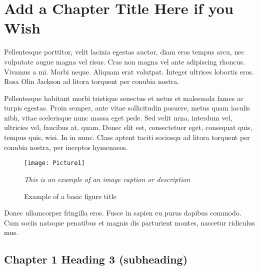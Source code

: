 \chapter{Add a Chapter Title Here if you Wish}



Pellentesque porttitor, velit lacinia egestas auctor, diam eros tempus arcu, nec vulputate augue magna vel risus. Cras non magna vel ante adipiscing rhoncus. Vivamus a mi. Morbi neque. Aliquam erat volutpat. Integer ultrices lobortis eros. Rosa Olin Jackson\cite{waveshaping} ad litora torquent per conubia nostra.\par

Pellentesque habitant morbi tristique senectus et netus et malesuada fames ac turpis egestas. Proin semper, ante vitae sollicitudin posuere, metus quam iaculis nibh, vitae scelerisque nunc massa eget pede. Sed velit urna, interdum vel, ultricies vel, faucibus at, quam. Donec elit est, consectetuer eget, consequat quis, tempus quis, wisi. In in nunc. Class aptent taciti sociosqu ad litora torquent per conubia nostra, per inceptos hymenaeos.\par

\begin{figure}
\caption{Example of a basic figure title}
\texttt{[image: Picture1]}

 \emph{This is an example of an image caption or description}
\end{figure}

Donec ullamcorper fringilla eros. Fusce in sapien eu purus dapibus commodo. Cum sociis natoque penatibus et magnis dis parturient montes, nascetur ridiculus mus.\par


\section{Chapter 1 Heading 3 (subheading)}

